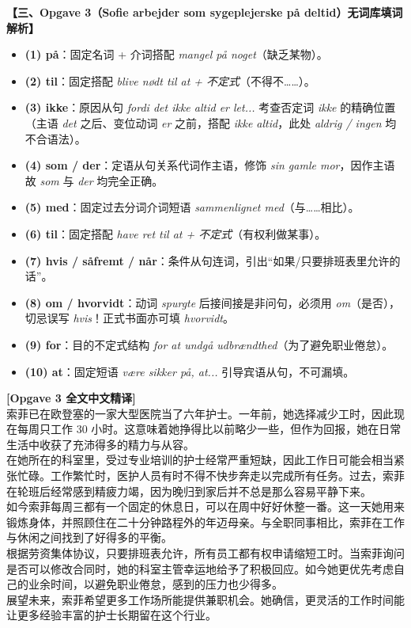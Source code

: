 \begin{answerbox}
\textbf{\color{NCDNavy}【三、Opgave 3（Sofie arbejder som sygeplejerske på deltid）无词库填词解析】}
\begin{itemize}
  \item \textbf{(1) på}：固定名词 + 介词搭配 \textit{mangel på noget}（缺乏某物）。
  \item \textbf{(2) til}：固定搭配 \textit{blive nødt til at + 不定式}（不得不……）。
  \item \textbf{(3) ikke}：原因从句 \textit{fordi det ikke altid er let...} 考查否定词 \textit{ikke} 的精确位置（主语 \textit{det} 之后、变位动词 \textit{er} 之前，搭配 \textit{ikke altid}，此处 \textit{aldrig / ingen} 均不合语法）。
  \item \textbf{(4) som / der}：定语从句关系代词作主语，修饰 \textit{sin gamle mor}，因作主语故 \textit{som} 与 \textit{der} 均完全正确。
  \item \textbf{(5) med}：固定过去分词介词短语 \textit{sammenlignet med}（与……相比）。
  \item \textbf{(6) til}：固定搭配 \textit{have ret til at + 不定式}（有权利做某事）。
  \item \textbf{(7) hvis / såfremt / når}：条件从句连词，引出“如果/只要排班表里允许的话”。
  \item \textbf{(8) om / hvorvidt}：动词 \textit{spurgte} 后接间接是非问句，必须用 \textit{om}（是否），切忌误写 \textit{hvis}！正式书面亦可填 \textit{hvorvidt}。
  \item \textbf{(9) for}：目的不定式结构 \textit{for at undgå udbrændthed}（为了避免职业倦怠）。
  \item \textbf{(10) at}：固定短语 \textit{være sikker på, at...} 引导宾语从句，不可漏填。
\end{itemize}
\end{answerbox}

\begin{transbox}
\small
\textbf{\color{NCDTeal}[Opgave 3 全文中文精译]}\\
索菲已在欧登塞的一家大型医院当了六年护士。一年前，她选择减少工时，因此现在每周只工作 30 小时。这意味着她挣得比以前略少一些，但作为回报，她在日常生活中收获了充沛得多的精力与从容。\\[3pt]
在她所在的科室里，受过专业培训的护士经常严重短缺，因此工作日可能会相当紧张忙碌。工作繁忙时，医护人员有时不得不快步奔走以完成所有任务。过去，索菲在轮班后经常感到精疲力竭，因为晚归到家后并不总是那么容易平静下来。\\[3pt]
如今索菲每周三都有一个固定的休息日，可以在周中好好休整一番。这一天她用来锻炼身体，并照顾住在二十分钟路程外的年迈母亲。与全职同事相比，索菲在工作与休闲之间找到了好得多的平衡。\\[3pt]
根据劳资集体协议，只要排班表允许，所有员工都有权申请缩短工时。当索菲询问是否可以修改合同时，她的科室主管幸运地给予了积极回应。如今她更优先考虑自己的业余时间，以避免职业倦怠，感到的压力也少得多。\\[3pt]
展望未来，索菲希望更多工作场所能提供兼职机会。她确信，更灵活的工作时间能让更多经验丰富的护士长期留在这个行业。
\end{transbox}

